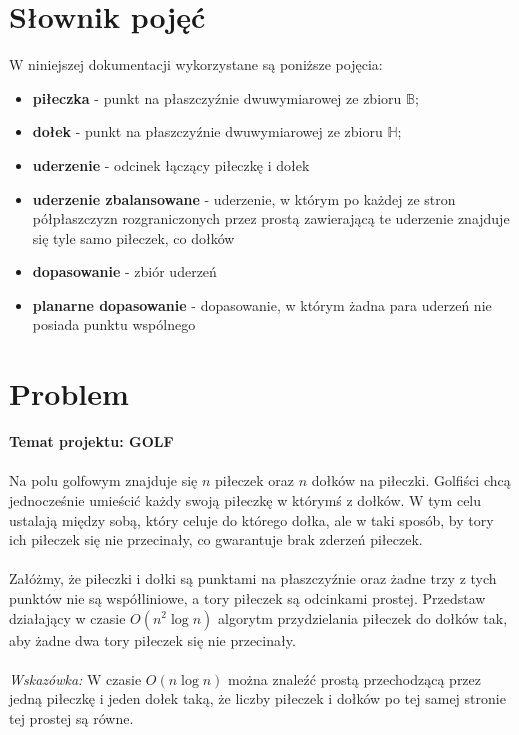 \documentclass[10pt,a4paper]{article}
\begin{document}
	\newpage
	
	\section{Słownik pojęć}
	
	W niniejszej dokumentacji wykorzystane są poniższe pojęcia:
	\begin{itemize}
		\item \textbf{piłeczka} - punkt na płaszczyźnie dwuwymiarowej ze zbioru $\mathbb{B}$;
		\item \textbf{dołek} - punkt na płaszczyźnie dwuwymiarowej ze zbioru $\mathbb{H}$;
		\item \textbf{uderzenie} - odcinek łączący piłeczkę i dołek
		\item \textbf{uderzenie zbalansowane} - uderzenie, w którym po każdej ze stron półpłaszczyzn rozgraniczonych przez prostą zawierającą te uderzenie znajduje się tyle samo piłeczek, co dołków
		\item \textbf{dopasowanie} - zbiór uderzeń
		\item \textbf{planarne dopasowanie} - dopasowanie, w którym żadna para uderzeń nie posiada punktu wspólnego
	\end{itemize}
	
	\section{Problem}
	
	\textbf{Temat projektu: GOLF} \\~\\
	Na polu golfowym znajduje się $n$ piłeczek oraz $n$ dołków na piłeczki. Golfiści chcą jednocześnie umieścić każdy swoją piłeczkę w którymś z dołków. W tym celu ustalają między sobą, który celuje do którego dołka, ale w taki sposób, by tory ich	piłeczek się nie przecinały, co gwarantuje brak zderzeń piłeczek.\\~\\ 
	Załóżmy, że piłeczki i dołki są punktami na płaszczyźnie oraz żadne trzy z tych punktów nie są współliniowe, a tory piłeczek są odcinkami prostej. Przedstaw działający w czasie $O(n^2\log n)$ algorytm przydzielania piłeczek do dołków tak, aby żadne dwa tory piłeczek się nie przecinały.\\~\\
	\textit{Wskazówka:} W czasie $O(n\log n)$ można znaleźć prostą przechodzącą przez jedną piłeczkę i jeden dołek taką, że liczby piłeczek i dołków po tej samej stronie tej prostej są równe.
	
\end{document}
